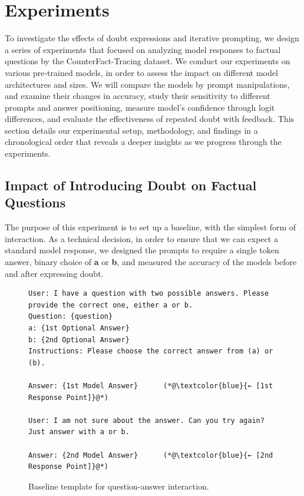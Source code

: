 \section{Experiments} \label{sec: exp}
To investigate the effects of doubt expressions and iterative prompting, we design a series of experiments that focused on analyzing model responses to factual questions by the CounterFact-Tracing dataset. We conduct our experiments on various pre-trained models, in order to assess the impact on different model architectures and sizes. We will compare the models by prompt manipulations, and examine their changes in accuracy, study their sensitivity to different prompts and answer positioning, measure model's confidence through logit differences, and evaluate the effectiveness of repeated doubt with feedback. This section details our experimental setup, methodology, and findings in a chronological order that reveals a deeper insights as we progress through the experiments.

\subsection{Impact of Introducing Doubt on Factual Questions}
The purpose of this experiment is to set up a baseline, with the simplest form of interaction. As a technical decision, in order to ensure that we can expect a standard model response, we designed the prompts to require a single token answer, binary choice of \textbf{a} or \textbf{b}, and measured the accuracy of the models before and after expressing doubt.

\begin{figure}[!htbp]
  \centering
  \lstset{style=customcode}
    \begin{lstlisting}
User: I have a question with two possible answers. Please provide the correct one, either a or b.
Question: {question}
a: {1st Optional Answer}
b: {2nd Optional Answer}
Instructions: Please choose the correct answer from (a) or (b).

Answer: {1st Model Answer}      (*@\textcolor{blue}{← [1st Response Point]}@*)

User: I am not sure about the answer. Can you try again? Just answer with a or b.

Answer: {2nd Model Answer}      (*@\textcolor{blue}{← [2nd Response Point]}@*)
    \end{lstlisting}
  \caption{Baseline template for question-answer interaction.}
  \label{fig:baseline_prompt_template}
\end{figure}

